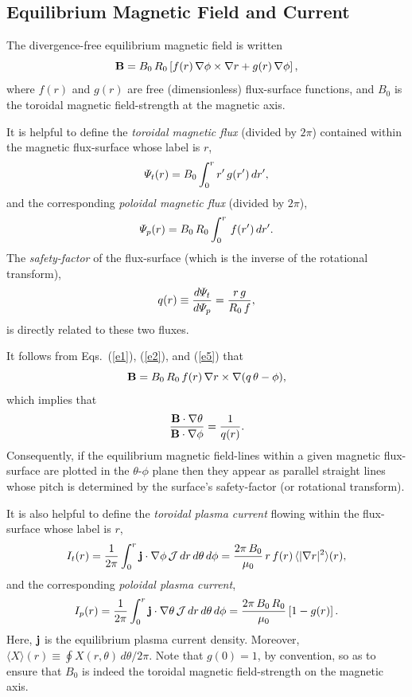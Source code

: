 \documentclass[12pt,prb,aps]{revtex4-1}
\begin{document}
\subsection{Equilibrium Magnetic Field and Current}
The divergence-free equilibrium magnetic field is written\,\cite{greene}
\begin{equation}\label{e2}
{\bf B} = B_0\,R_0\left[f(r)\,\nabla\phi\times \nabla r+g(r)\,\nabla\phi\right],
\end{equation}
where $f(r)$ and $g(r)$ are free (dimensionless)  flux-surface functions, and $B_0$ is the toroidal magnetic field-strength at the magnetic axis. 

It is helpful to define the {\em toroidal magnetic flux}\/ (divided by $2\pi$) contained within the magnetic flux-surface whose label is $r$,
\begin{equation}
{\mit\Psi}_t(r)= B_0\int_0^r r'\,g(r')\,dr',
\end{equation}
and the corresponding {\em poloidal magnetic flux}\/ (divided by $2\pi$),
\begin{equation}\label{e4}
{\mit\Psi}_p(r)= B_0\,R_0\int_0^r\,f(r')\,dr'.
\end{equation}
The {\em safety-factor}\/ of the flux-surface (which is the inverse of the rotational transform),\cite{boz}
\begin{equation}\label{e5}
q(r)\equiv \frac{d{\mit\Psi}_t}{d{\mit\Psi}_p} = \frac{r\,g}{R_0\,f},
\end{equation}
is directly related to these two fluxes.

It follows from Eqs.~(\ref{e1}), (\ref{e2}), and (\ref{e5}) that
\begin{equation}
{\bf B} = B_0\,R_0\,f(r)\,\nabla r\times \nabla(q\,\theta -\phi),
\end{equation}
which implies that
\begin{equation}\label{e7y}
\frac{{\bf B}\cdot\nabla \theta}{{\bf B}\cdot\nabla\phi} = \frac{1}{q(r)}.
\end{equation}
Consequently,  if the equilibrium magnetic field-lines within a given  magnetic flux-surface are plotted in the $\theta$-$\phi$
plane then they appear as parallel straight lines whose pitch is determined by the surface's safety-factor (or rotational transform). 

It is also helpful to define the {\em toroidal plasma current}\/ flowing within the flux-surface whose label is $r$,
\begin{equation}\label{e6}
I_t(r)= \frac{1}{2\pi}\int_0^r {\bf j}\cdot\nabla\phi \,{\cal J}\,dr\,d\theta\,d\phi = \frac{2\pi\,B_0}{\mu_0}\,r\,f(r)\,\langle|\nabla r|^2\rangle(r),
\end{equation}
and the corresponding {\em poloidal plasma current},
\begin{equation}\label{e7}
I_p(r)= \frac{1}{2\pi}\int_0^r {\bf j}\cdot\nabla\theta\,{\cal J}\,dr\,d\theta\,d\phi = \frac{2\pi\,B_0\,R_0}{\mu_0}\left[1-g(r)\right].
\end{equation}
Here, ${\bf j}$ is the equilibrium plasma current density.  Moreover, $\langle X\rangle(r) \equiv \oint X(r,\theta)\,d\theta/2\pi$. 
Note that $g(0)=1$, by convention, so as to ensure that $B_0$ is indeed the toroidal magnetic field-strength on the magnetic axis.
\end{document}

